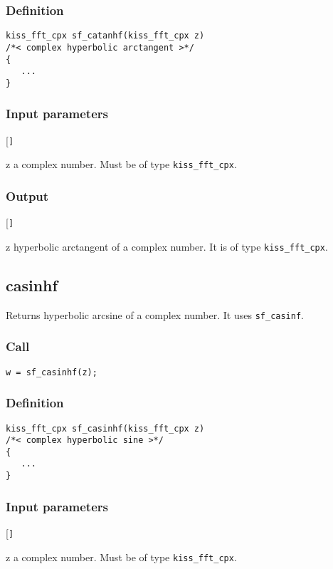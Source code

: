 \subsubsection*{Definition}
\begin{verbatim}
kiss_fft_cpx sf_catanhf(kiss_fft_cpx z)
/*< complex hyperbolic arctangent >*/
{
   ...
}     
\end{verbatim}

\subsubsection*{Input parameters}
\begin{desclist}{\tt }{\quad}[\tt ]
   \setlength\itemsep{0pt}
   \item[z] a complex number. Must be of type \texttt{kiss\_fft\_cpx}.
\end{desclist}

\subsubsection*{Output}
\begin{desclist}{\tt }{\quad}[\tt ]
   \setlength\itemsep{0pt}
   \item[z] hyperbolic arctangent of a complex number. It is of type \texttt{kiss\_fft\_cpx}.
\end{desclist}



\subsection{{casinhf}}
Returns hyperbolic arcsine of a complex number. It uses \texttt{sf\_casinf}.

\subsubsection*{Call}
\begin{verbatim}w = sf_casinhf(z);\end{verbatim}

\subsubsection*{Definition}
\begin{verbatim}
kiss_fft_cpx sf_casinhf(kiss_fft_cpx z)
/*< complex hyperbolic sine >*/
{
   ...
}     
\end{verbatim}

\subsubsection*{Input parameters}
\begin{desclist}{\tt }{\quad}[\tt ]
   \setlength\itemsep{0pt}
   \item[z] a complex number. Must be of type \texttt{kiss\_fft\_cpx}.
\end{desclist}

